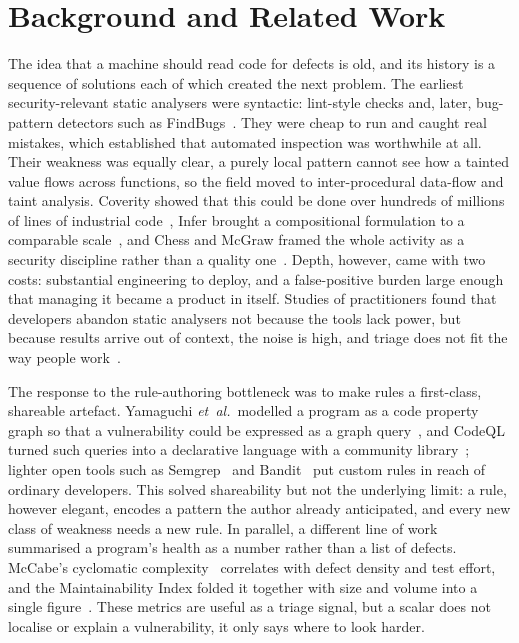 \section{Background and Related Work}
\label{sec:related}

The idea that a machine should read code for defects is old, and its
history is a sequence of solutions each of which created the next
problem. The earliest security-relevant static analysers were syntactic:
lint-style checks and, later, bug-pattern detectors such as
FindBugs~\cite{ayewah2008}. They were cheap to run and caught real
mistakes, which established that automated inspection was worthwhile at
all. Their weakness was equally clear, a purely local pattern cannot see
how a tainted value flows across functions, so the field moved to
inter-procedural data-flow and taint analysis. Coverity showed that this
could be done over hundreds of millions of lines of industrial
code~\cite{bessey2010}, Infer brought a compositional formulation to a
comparable scale~\cite{distefano2019}, and Chess and McGraw framed the
whole activity as a security discipline rather than a quality
one~\cite{chess2004}. Depth, however, came with two costs: substantial
engineering to deploy, and a false-positive burden large enough that
managing it became a product in itself. Studies of practitioners found
that developers abandon static analysers not because the tools lack
power, but because results arrive out of context, the noise is high, and
triage does not fit the way people work~\cite{johnson2013,nachtigall2022}.

The response to the rule-authoring bottleneck was to make rules a
first-class, shareable artefact. Yamaguchi \textit{et~al.}\ modelled a
program as a code property graph so that a vulnerability could be
expressed as a graph query~\cite{yamaguchi2014}, and CodeQL turned such
queries into a declarative language with a community
library~\cite{avgustinov2016}; lighter open tools such as
Semgrep~\cite{semgrep} and Bandit~\cite{bandit} put custom rules in reach
of ordinary developers. This solved shareability but not the underlying
limit: a rule, however elegant, encodes a pattern the author already
anticipated, and every new class of weakness needs a new rule. In
parallel, a different line of work summarised a program's health as a
number rather than a list of defects. McCabe's cyclomatic
complexity~\cite{mccabe1976} correlates with defect density and test
effort, and the Maintainability Index folded it together with size and
volume into a single figure~\cite{coleman1994}. These metrics are useful
as a triage signal, but a scalar does not localise or explain a
vulnerability, it only says where to look harder.

